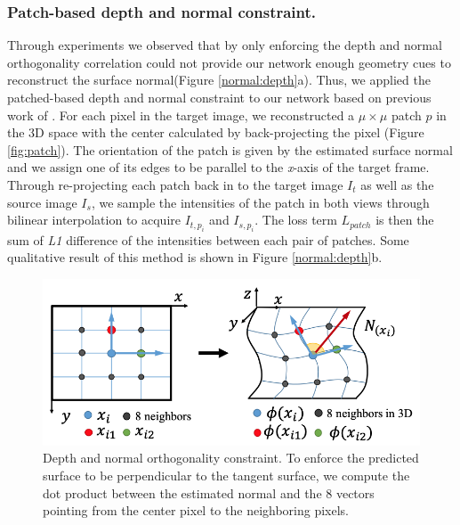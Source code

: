 \documentclass[10pt,twocolumn,letterpaper]{article}
\begin{document}
\subsubsection{Patch-based depth and normal constraint.} 
Through experiments we observed that by only enforcing the depth and normal orthogonality correlation could not provide our network enough geometry cues to reconstruct the surface normal(Figure \ref{normal:depth}a). Thus, we applied the patched-based depth and normal constraint to our network based on previous work of \cite{furukawa2010accurate}. For each pixel in the target image, we reconstructed a $\mu \times \mu$ patch $p$ in the 3D space with the center calculated by back-projecting the pixel (Figure  \ref{fig:patch}). The orientation of the patch is given by the estimated surface normal and we assign one of its edges to be parallel to the \textit{x}-axis of the target frame. Through re-projecting each patch back in to the target image $I_t$ as well as the source image $I_s$, we sample the intensities of the patch in both views through bilinear interpolation to acquire $I_{t,p_i}$ and $I_{s,p_i}$. The loss term $L_{patch}$ is then the sum of \textit{L1} difference of the intensities between each pair of patches. Some qualitative result of this method is shown in Figure \ref{normal:depth}b.
\begin{figure}
  \includegraphics[width=\columnwidth ]{8point.png}
  \caption{Depth and normal orthogonality constraint. To enforce the predicted surface to be perpendicular to the tangent surface, we compute the dot product between the estimated normal and the 8 vectors pointing from the center pixel to the neighboring pixels.}
  \label{fig:8point}
\end{figure}
\end{document}
